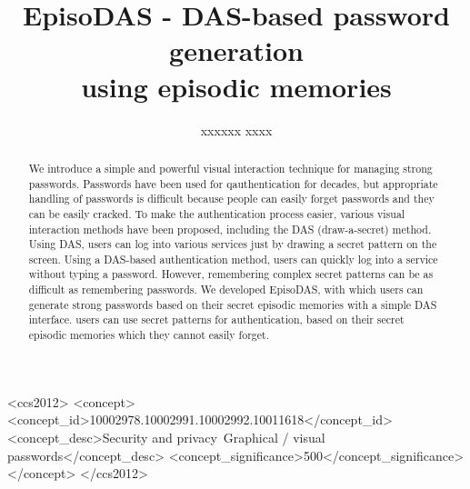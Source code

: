 \documentclass[sigconf]{acmart}
\begin{document}
\title{EpisoDAS - DAS-based password generation \\
using episodic memories}

\author{xxxxxx xxxx}


\begin{CCSXML}
  <ccs2012>
  <concept>
  <concept_id>10002978.10002991.10002992.10011618</concept_id>
  <concept_desc>Security and privacy~Graphical / visual passwords</concept_desc>
  <concept_significance>500</concept_significance>
  </concept>
  </ccs2012>
\end{CCSXML}


\begin{abstract}

We introduce a simple and powerful visual interaction technique for
managing strong passwords.
%
Passwords have been used for qauthentication for decades, but
appropriate handling of passwords is difficult because people can
easily forget passwords and they can be easily cracked.
%
To make the authentication process easier, various visual interaction
methods have been proposed, including the DAS (draw-a-secret)
method. Using DAS, users can log into various services just by drawing
a secret pattern on the screen.
%
Using a DAS-based authentication method, users can quickly log into a
service without typing a password. However, remembering complex secret
patterns can be as difficult as remembering passwords. We developed
EpisoDAS, with which users can generate strong passwords based on
their secret episodic memories with a simple DAS interface.
%
users can use secret patterns for authentication, based on their
secret episodic memories which they cannot easily forget.

\end{abstract}

\maketitle
\end{document}
